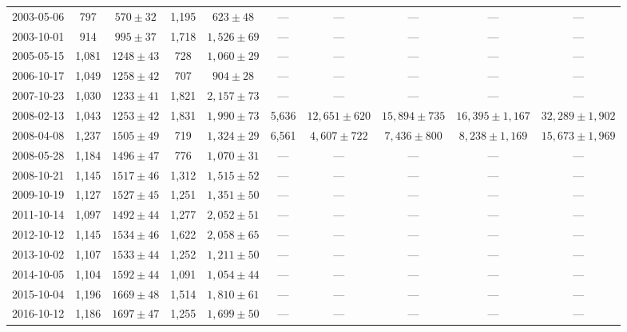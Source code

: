 \begin{landscape}
\begin{longtable}{cccccccccc}
{2003-05-06} & 797 & {$570  \pm  32$} & 1,195 & {$623 \pm 48$} & --- & --- & --- & --- & --- \\
{2003-10-01} & 914 & {$995  \pm  37$} & 1,718 & {$1,526 \pm 69$} & --- & --- & --- & --- & --- \\
{2005-05-15} & 1,081 & {$1248  \pm  43$} & 728 & {$1,060 \pm 29$} & --- & --- & --- & --- & --- \\
{2006-10-17} & 1,049 & {$1258  \pm  42$} & 707 & {$904 \pm 28$} & --- & --- & --- & --- & --- \\
{2007-10-23} & 1,030 & {$1233  \pm  41$} & 1,821 & {$2,157 \pm 73$} & --- & --- & --- & --- & --- \\
{2008-02-13} & 1,043 & {$1253  \pm  42$} & 1,831 & {$1,990 \pm 73$} & 5,636 & {$12,651 \pm 620$} & {$15,894 \pm 735$} & {$16,395 \pm 1,167$} & {$32,289 \pm 1,902$} \\
{2008-04-08} & 1,237 & {$1505  \pm  49$} & 719 & {$1,324 \pm 29$} & 6,561 & {$4,607 \pm 722$} & {$7,436 \pm 800$} & {$8,238 \pm 1,169$} & {$15,673 \pm 1,969$} \\
{2008-05-28} & 1,184 & {$1496  \pm  47$} & 776 & {$1,070 \pm 31$} & --- & --- & --- & --- & --- \\
{2008-10-21} & 1,145 & {$1517  \pm  46$} & 1,312 & {$1,515 \pm 52$} & --- & --- & --- & --- & --- \\
{2009-10-19} & 1,127 & {$1527  \pm  45$} & 1,251 & {$1,351 \pm 50$} & --- & --- & --- & --- & --- \\
{2011-10-14} & 1,097 & {$1492  \pm  44$} & 1,277 & {$2,052 \pm 51$} & --- & --- & --- & --- & --- \\
{2012-10-12} & 1,145 & {$1534  \pm  46$} & 1,622 & {$2,058 \pm 65$} & --- & --- & --- & --- & --- \\
{2013-10-02} & 1,107 & {$1533  \pm  44$} & 1,252 & {$1,211 \pm 50$} & --- & --- & --- & --- & --- \\
{2014-10-05} & 1,104 & {$1592  \pm  44$} & 1,091 & {$1,054 \pm 44$} & --- & --- & --- & --- & --- \\
{2015-10-04} & 1,196 & {$1669  \pm  48$} & 1,514 & {$1,810 \pm 61$} & --- & --- & --- & --- & --- \\
{2016-10-12} & 1,186 & {$1697  \pm  47$} & 1,255 & {$1,699 \pm 50$} & --- & --- & --- & --- & --- \\
\end{longtable} 
\end{landscape} 
